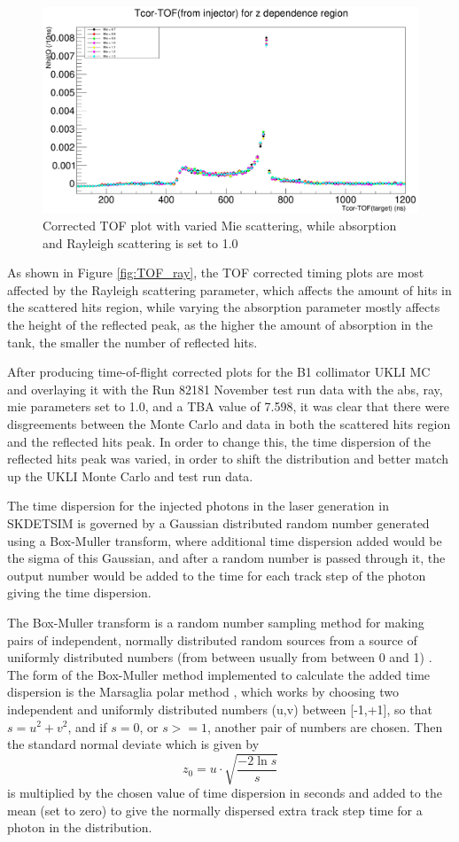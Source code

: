 \begin{figure}
    \centering
    \includegraphics[width=\textwidth]{Figures/TOF_mie.PNG}
    \caption{Corrected TOF plot with varied Mie scattering, while absorption and Rayleigh scattering is set to 1.0}
    \label{fig:TOF_mie}
\end{figure}

As shown in Figure \ref{fig:TOF_ray}, the TOF corrected timing plots are most affected by the Rayleigh scattering parameter, which affects the amount of hits in the scattered hits region, while varying the absorption parameter mostly affects the height of the reflected peak, as the higher the amount of absorption in the tank, the smaller the number of reflected hits. 

After producing time-of-flight corrected plots for the B1 collimator UKLI MC and overlaying it with the Run 82181 November test run data with the abs, ray, mie parameters set to 1.0, and a TBA value of 7.598, it was clear that there were disgreements between the Monte Carlo and data in both the scattered hits region and the reflected hits peak. In order to change this, the time dispersion of the reflected hits peak was varied, in order to shift the distribution and better match up the UKLI Monte Carlo and test run data. 

The time dispersion for the injected photons in the laser generation in SKDETSIM is governed by a Gaussian distributed random number generated using a Box-Muller transform, where additional time dispersion added would be the sigma of this Gaussian, and after a random number is passed through it, the output number would be added to the time for each track step of the photon giving the time dispersion.

The Box-Muller transform is a random number sampling method for making pairs of independent, normally distributed random sources from a source of uniformly distributed numbers (from between usually from between 0 and 1) \cite{10.1214/aoms/1177706645}. The form of the Box-Muller method implemented to calculate the added time dispersion is the Marsaglia polar method \cite{doi:10.1137/1006063}, which works by choosing two independent and uniformly distributed numbers (u,v) between [-1,+1], so that $s = u^{2} + v^{2}$, and if $s=0$, or $s>=1$, another pair of numbers are chosen. Then the standard normal deviate which is given by $$z_{0}=u \cdot \sqrt{\frac{-2 \ln s}{s}}$$ is multiplied by the chosen value of time dispersion in seconds and added to the mean (set to zero) to give the normally dispersed extra track step time for a photon in the distribution. 

